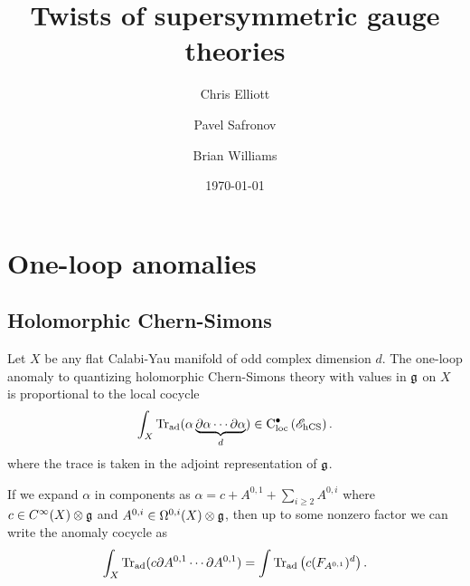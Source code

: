 \documentclass[10pt, oneside]{article}
\title{Twists of supersymmetric gauge theories}
\author{Chris Elliott\and Pavel Safronov \and Brian Williams}
\date{\today}
\begin{document}
\maketitle

\section{One-loop anomalies}

\subsection{Holomorphic Chern-Simons}

\begin{prop}
Let $X$ be any flat Calabi-Yau manifold of odd complex dimension $d$. 
The one-loop anomaly to quantizing holomorphic Chern-Simons theory with values in $\mathfrak g$ on $X$ is proportional to the local cocycle
\[
\int_X {\rm Tr}_{\rm ad} (\alpha \underbrace{\partial \alpha \cdots \partial \alpha}_{d}) \in {\rm C}_{\rm loc}^\bullet \left(\mathscr E_{\rm hCS}\right) .
\] 
where the trace is taken in the adjoint representation of $\mathfrak g$. 
\end{prop}

\begin{rmk}
If we expand $\alpha$ in components as $\alpha = c + A^{0,1} + \sum_{i \geq 2} A^{0,i}$ where $c \in C^\infty(X) \otimes \mathfrak g$ and $A^{0,i} \in \Omega^{0,i}(X) \otimes \mathfrak g$, then up to some nonzero factor we can write the anomaly cocycle as 
\[
\int_X {\rm Tr}_{\rm ad} (c \partial A^{0,1} \cdots \partial A^{0,1}) = \int {\rm Tr}_{\rm ad} \left(c (F_{A^{0,1}})^d \right) .
\]
\end{rmk}
\end{document}
